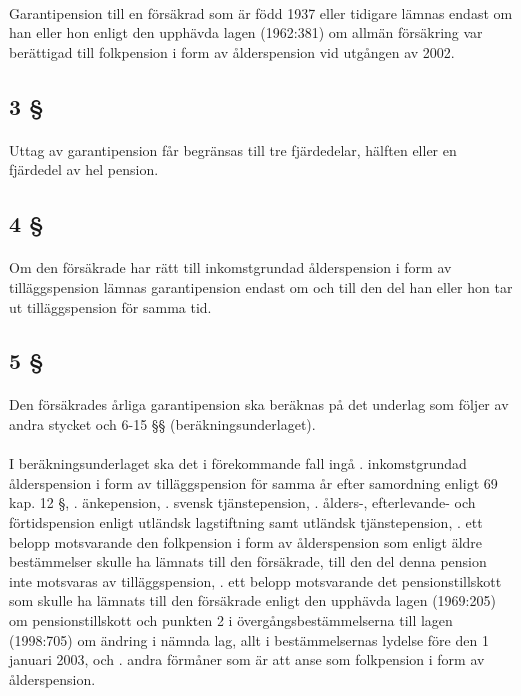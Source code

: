 \documentclass[a4paper,notitlepage,openany,10pt]{book}
\begin{document}
\paragraph*{}
Garantipension till en försäkrad som är född 1937 eller tidigare lämnas endast om han eller hon enligt den upphävda lagen (1962:381) om allmän försäkring var berättigad till folkpension i form av ålderspension vid utgången av 2002.
\subsection*{3 §}
\paragraph*{}
Uttag av garantipension får begränsas till tre fjärdedelar, hälften eller en fjärdedel av hel pension.
\subsection*{4 §}
\paragraph*{}
Om den försäkrade har rätt till inkomstgrundad ålderspension i form av tilläggspension lämnas garantipension endast om och till den del han eller hon tar ut tilläggspension för samma tid.
\subsection*{5 §}
\paragraph*{}
Den försäkrades årliga garantipension ska beräknas på det underlag som följer av andra stycket och 6-15 §§ (beräkningsunderlaget).
\paragraph*{}
I beräkningsunderlaget ska det i förekommande fall ingå
. inkomstgrundad ålderspension i form av tilläggspension för samma år efter samordning enligt 69 kap. 12 §,
. änkepension,
. svensk tjänstepension,
. ålders-, efterlevande- och förtidspension enligt utländsk lagstiftning samt utländsk tjänstepension,
. ett belopp motsvarande den folkpension i form av ålderspension som enligt äldre bestämmelser skulle ha lämnats till den försäkrade, till den del denna pension inte motsvaras av tilläggspension,
. ett belopp motsvarande det pensionstillskott som skulle ha lämnats till den försäkrade enligt den upphävda lagen (1969:205) om pensionstillskott och punkten 2 i övergångsbestämmelserna till lagen (1998:705) om ändring i nämnda lag, allt i bestämmelsernas lydelse före den 1 januari 2003, och
. andra förmåner som är att anse som folkpension i form av ålderspension.
\end{document}

